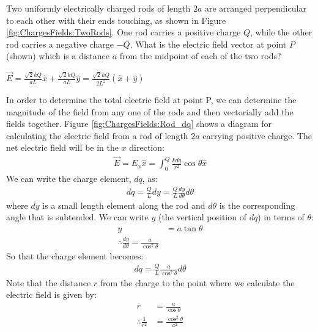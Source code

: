 \question Two uniformly electrically charged rods of length $2a$ are arranged perpendicular to each other with their ends touching, as shown in Figure \ref{fig:ChargesFields:TwoRods}. One rod carries a positive charge $Q$, while the other rod carries a negative charge $-Q$. What is the electric field vector at point $P$ (shown) which is a distance $a$ from the midpoint of each of the two rods?
\begin{finalanswer}
	$\vec E = \frac{\sqrt{2}kQ}{aL}\hat x + \frac{\sqrt{2}kQ}{aL}\hat y=\frac{\sqrt{2}kQ}{2L^2}(\hat x + \hat y)$
\end{finalanswer}
\begin{solution}
	In order to determine the total electric field at point P, we can determine the magnitude of the field from any one of the rods and then vectorially add the fields together. Figure \ref{fig:ChargesFields:Rod_dq} shows a diagram for calculating the electric field from a rod of length $2a$ carrying positive charge.
	The net electric field will be in the $x$ direction:
	\begin{align*}
	\vec E=E_x\hat x=\int_0^Q\frac{kdq}{r^2}\cos\theta \hat x
	\end{align*}
	We can write the charge element, $dq$, as:
	\begin{align*}
	dq=\frac{Q}{L}dy=\frac{Q}{L}\frac{dy}{d\theta}{d\theta}
	\end{align*}
	where $dy$ is a small length element along the rod and $d\theta$ is the corresponding angle that is subtended. We can write $y$ (the vertical position of $dq$) in terms of $\theta$:
	\begin{align*}
	y&=a\tan\theta\\
	\therefore\frac{dy}{d\theta}=\frac{a}{\cos^2\theta}
	\end{align*}
	So that the charge element becomes:
	\begin{align*}
	dq=\frac{Q}{L}\frac{a}{\cos^2\theta}d\theta
	\end{align*}
	Note that the distance $r$ from the charge to the point where we calculate the electric field is given by:
	\begin{align*}
	r&=\frac{a}{\cos\theta}\\
	\therefore\frac{1}{r^2}&=\frac{\cos^2\theta}{a^2}

\end{align*}
\end{solution}
